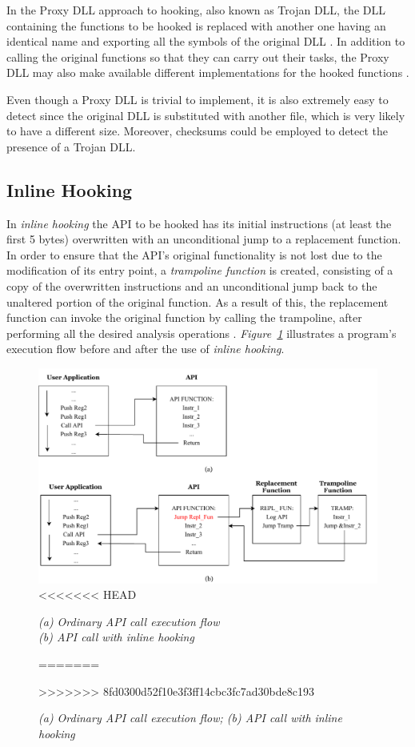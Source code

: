 In the Proxy DLL approach to hooking, also known as Trojan DLL, the DLL containing the functions to be hooked is replaced with another one having an identical name and exporting all the symbols of the original DLL \cite{CodeProjectHooking}. In addition to calling the original functions so that they can carry out their tasks, the Proxy DLL may also make available different implementations for the hooked functions \cite{Berdajs:2010:EAU:1815744.1815746}.

Even though a Proxy DLL is trivial to implement, it is also extremely easy to detect since the original DLL is substituted with another file, which is very likely to have a different size. Moreover, checksums could be employed to detect the presence of a Trojan DLL.


\subsection{Inline Hooking}

In \textit{inline hooking} the API to be hooked has its initial instructions (at least the first 5 bytes) overwritten with an unconditional jump to a replacement function. In order to ensure that the API's original functionality is not lost due to the modification of its entry point, a \textit{trampoline function} is created, consisting of a copy of the overwritten instructions and an unconditional jump back to the unaltered portion of the original function. As a result of this, the replacement function can invoke the original function by calling the trampoline, after performing all the desired analysis operations \cite{Berdajs:2010:EAU:1815744.1815746}.
\textit{Figure~\ref{Inlined}} illustrates a program's execution flow before and after the use of \textit{inline hooking}.

\begin{figure}[h]
\centering
\includegraphics[scale=0.8]{Figures/Inline.pdf}
<<<<<<< HEAD
\caption{\textit{(a) Ordinary API call execution flow \\
				  (b) API call with inline hooking}}
\label{Inlined}
=======
\caption{\textit{(a) Ordinary API call execution flow; (b) API call with inline hooking}}
>>>>>>> 8fd0300d52f10e3f3ff14cbc3fc7ad30bde8c193
\end{figure}

